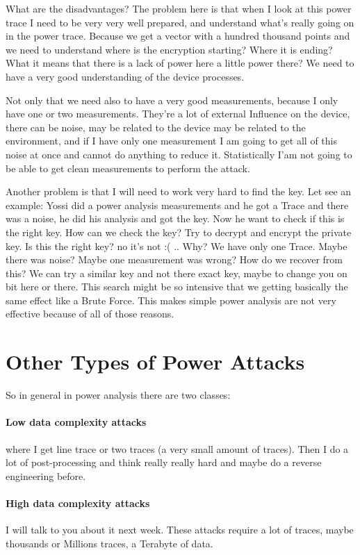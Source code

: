 What are the disadvantages? The problem here is that when I look at this power
trace I need to be very very well prepared, and understand what's really going
on in the power trace. Because we get a vector with a hundred thousand points
and we need to understand where is the encryption starting? Where it is ending?
What it means that there is a lack of power here a little power there? We need
to have a very good understanding of the device processes. 

Not only that we need also to have a very good measurements, because I only have
one or two measurements. They're a lot of external Influence on the device,
there can be noise, may be related to the device may be related to the
environment, and if I have only one measurement I am going to get all of this
noise at once and cannot do anything to reduce it. Statistically I'am not going
to be able to get clean measurements to perform the attack.

Another problem is that I will need to work very hard to find the key. Let see
an example: Yossi did a power analysis measurements and he got a Trace and there
was a noise, he did his analysis and got the key. Now he want to check if this
is the right key. How can we check the key? Try to decrypt and encrypt the
private key. Is this the right key? no it's not :( .. Why? We have only one
Trace. Maybe there was noise? Maybe one measurement was wrong? How do we recover
from this? We can try a similar key and not there exact key, maybe to change you
on bit here or there. This search might be so intensive that we getting
basically the same effect like a Brute Force. This makes simple power analysis
are not very effective because of all of those reasons.

\section{Other Types of Power Attacks}

So in general in power analysis there are two classes:

\paragraph{Low data complexity attacks} where I get line trace or two traces (a
very small amount of traces). Then I do a lot of post-processing and think
really really hard and maybe do a reverse engineering before.

\paragraph{High data complexity attacks} I will talk to you about it next week.
These attacks require a lot of traces, maybe thousands or Millions traces, a
Terabyte of data.

